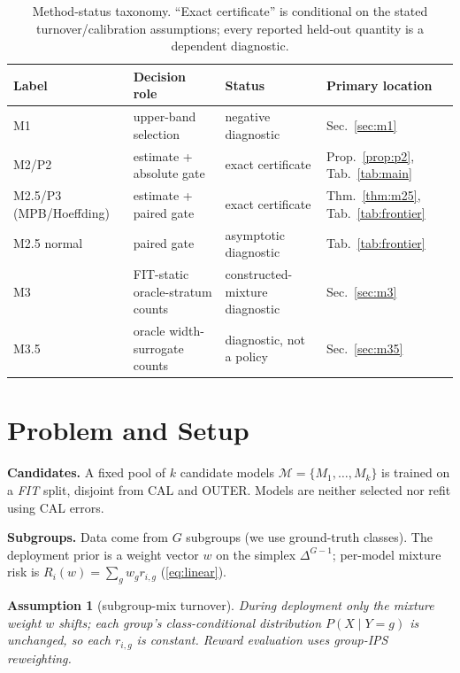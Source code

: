 \documentclass{article}
\newtheorem{assumption}{Assumption}
\begin{document}
\FloatBarrier
\begin{table}[t]
\centering\footnotesize\setlength{\tabcolsep}{1pt}
\begin{tabular}{llll}
\toprule
Label & Decision role & Status & Primary location \\
\midrule
M1 & upper-band selection & negative diagnostic & Sec.~\ref{sec:m1} \\
M2/P2 & estimate + absolute gate & exact certificate & Prop.~\ref{prop:p2}, Tab.~\ref{tab:main} \\
M2.5/P3 (MPB/Hoeffding) & estimate + paired gate & exact certificate & Thm.~\ref{thm:m25}, Tab.~\ref{tab:frontier} \\
M2.5 normal & paired gate & asymptotic diagnostic & Tab.~\ref{tab:frontier} \\
M3 & FIT-static oracle-stratum counts & constructed-mixture diagnostic & Sec.~\ref{sec:m3} \\
M3.5 & oracle width-surrogate counts & diagnostic, not a policy & Sec.~\ref{sec:m35} \\
\bottomrule
\end{tabular}
\caption{Method-status taxonomy. ``Exact certificate'' is conditional on the stated
turnover/calibration assumptions; every reported held-out quantity is a dependent diagnostic.}
\label{tab:taxonomy}
\end{table}

\section{Problem and Setup}
\label{sec:setup}

\textbf{Candidates.} A fixed pool of $k$ candidate models $\mathcal{M}=\{M_1,\dots,M_k\}$
is trained on a \emph{FIT} split, disjoint from CAL and OUTER. Models are neither selected nor
refit using CAL errors.

\textbf{Subgroups.} Data come from $G$ subgroups (we use ground-truth classes). The
deployment prior is a weight vector $w$ on the simplex $\Delta^{G-1}$; per-model mixture
risk is $R_i(w)=\sum_g w_g r_{i,g}$ (\eqref{eq:linear}).

\begin{assumption}[subgroup-mix turnover]
\label{ass:turnover}
During deployment only the mixture weight $w$ shifts; each group's class-conditional
distribution $P(X\mid Y{=}g)$ is unchanged, so each $r_{i,g}$ is constant. Reward
evaluation uses group-IPS reweighting.
\end{assumption}
\end{document}
